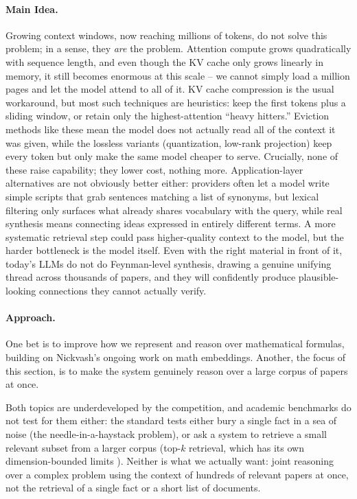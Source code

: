\paragraph{Main Idea.}
Growing context windows, now reaching millions of tokens, do not solve this problem; in a sense, they \emph{are} the problem. Attention compute grows quadratically with sequence length, and even though the KV cache only grows linearly in memory, it still becomes enormous at this scale -- we cannot simply load a million pages and let the model attend to all of it. KV cache compression is the usual workaround, but most such techniques are heuristics: keep the first tokens plus a sliding window, or retain only the highest-attention ``heavy hitters.'' Eviction methods like these mean the model does not actually read all of the context it was given, while the lossless variants (quantization, low-rank projection) keep every token but only make the same model cheaper to serve. Crucially, none of these raise capability; they lower cost, nothing more. Application-layer alternatives are not obviously better either: providers often let a model write simple scripts that grab sentences matching a list of synonyms, but lexical filtering only surfaces what already shares vocabulary with the query, while real synthesis means connecting ideas expressed in entirely different terms. A more systematic retrieval step could pass higher-quality context to the model, but the harder bottleneck is the model itself. Even with the right material in front of it, today's LLMs do not do Feynman-level synthesis, drawing a genuine unifying thread across thousands of papers, and they will confidently produce plausible-looking connections they cannot actually verify.

\paragraph{Approach.}
One bet is to improve how we represent and reason over mathematical formulas, building on Nickvash's ongoing work on math embeddings. Another, the focus of this section, is to make the system genuinely reason over a large corpus of papers at once.

Both topics are underdeveloped by the competition, and academic benchmarks do not test for them either: the standard tests either bury a single fact in a sea of noise (the needle-in-a-haystack problem), or ask a system to retrieve a small relevant subset from a larger corpus (top-$k$ retrieval, which has its own dimension-bounded limits \cite{2508.21038}). Neither is what we actually want: joint reasoning over a complex problem using the context of hundreds of relevant papers at once, not the retrieval of a single fact or a short list of documents.

